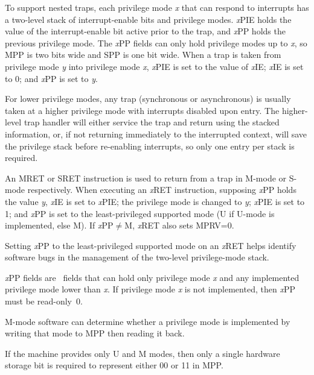 To support nested traps, each privilege mode {\em x} that can respond to
interrupts has a two-level
stack of interrupt-enable bits and privilege modes.  {\em x}\/PIE
holds the value of the interrupt-enable bit active prior to the trap,
and {\em x}\/PP holds the previous privilege mode.  The {\em x}\/PP
fields can only hold privilege modes up to {\em x}, so MPP is
two bits wide and SPP is one bit wide.  When
a trap is taken from privilege mode {\em y} into privilege mode {\em
  x}, {\em x}\/PIE is set to the value of {\em x}\/IE; {\em x}\/IE is set to
0; and {\em x}\/PP is set to {\em y}.

\begin{commentary}
For lower privilege modes, any trap (synchronous or asynchronous) is
usually taken at a higher privilege mode with interrupts disabled upon entry.
The higher-level trap handler will either service the trap and return
using the stacked information, or, if not returning immediately to the
interrupted context, will save the privilege stack before re-enabling
interrupts, so only one entry per stack is required.
\end{commentary}

An MRET or SRET instruction is used to return from
a trap in M-mode or S-mode respectively.  When
executing an {\em x}\/RET instruction, supposing {\em x}\/PP holds the
value {\em y}, {\em x}\/IE is set to {\em x}\/PIE; the privilege mode
is changed to {\em y}; {\em x}\/PIE is set to 1; and {\em x}\/PP is
set to the least-privileged supported mode (U if U-mode is implemented, else M).
If {\em x}\/PP$\neq$M, {\em x}\/RET also sets MPRV=0.

\begin{commentary}
Setting {\em x}\/PP to the least-privileged supported mode on an {\em x}\/RET
helps identify software bugs in the management of the two-level privilege-mode
stack.
\end{commentary}

{\em x}\/PP fields are \warl\ fields that can hold only privilege mode {\em x}
and any implemented privilege mode lower than {\em x}.  If privilege mode {\em
x} is not implemented, then {\em x}\/PP must be read-only~0.

\begin{commentary}
M-mode software can determine whether a privilege mode is implemented
by writing that mode to MPP then reading it back.

If the machine provides only U and M modes, then only a single
hardware storage bit is required to represent either 00 or 11 in MPP.
\end{commentary}

